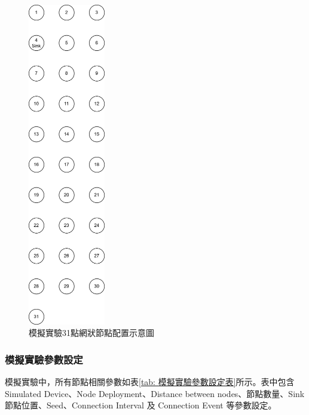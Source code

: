 \begin{ZhChapter}
\begin{figure}[H]
    \centering
    \includegraphics[width = 0.3\textwidth]{image/模擬實驗31點網狀節點配置示意圖.png}
    \caption{模擬實驗31點網狀節點配置示意圖}
    \label{fig: 模擬實驗31點網狀節點配置示意圖}
\end{figure}

\subsubsection{模擬實驗參數設定}
模擬實驗中，所有節點相關參數如表\ref{tab: 模擬實驗參數設定表}所示。表中包含Simulated Device、Node Deployment、Distance between nodes、節點數量、Sink 節點位置、Seed、Connection Interval 及 Connection Event 等參數設定。


\end{ZhChapter}
